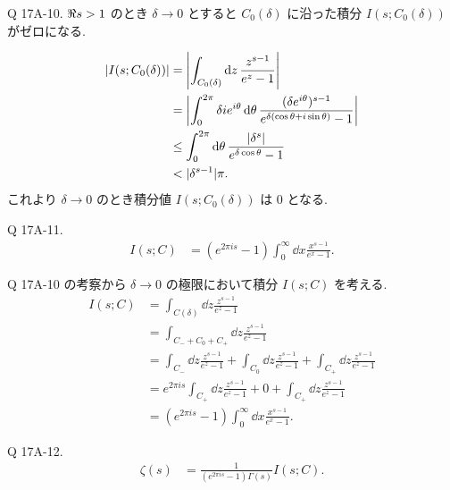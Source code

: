 \documentclass[uplatex,dvipdfmx,a4paper,11pt]{jlreq}
\theoremstyle{definition}
\begin{document}
\begin{itembox}[l]{Q 17A-10.}
  $\real s > 1$ のとき $\delta\to 0$ とすると $C_0(\delta)$ に沿った積分 $I(s;C_0(\delta))$ がゼロになる.
\end{itembox}
\begin{align}
  |I(s;C_0(\delta))| & = \qty|\int_{C_0(\delta)}\dd{z}\frac{z^{s-1}}{e^z - 1}|                                                                        \\
                     & = \qty|\int_0^{2\pi}\delta ie^{i\theta}\dd{\theta}\frac{(\delta e^{i\theta})^{s-1}}{e^{\delta(\cos\theta + i\sin\theta)} - 1}| \\
                     & \leq \int_0^{2\pi}\dd{\theta}\frac{|\delta^s|}{e^{\delta\cos\theta} - 1}                                                       \\
                     & < |\delta^{s-1}|\pi.
\end{align}
これより $\delta\to 0$ のとき積分値 $I(s; C_0(\delta))$ は $0$ となる.

\begin{itembox}[l]{Q 17A-11.}
  \begin{align}
    I(s; C) & = (e^{2\pi is} - 1)\int_0^\infty\dd{x}\frac{x^{s-1}}{e^x - 1}.
  \end{align}
\end{itembox}
Q 17A-10 の考察から $\delta\to 0$ の極限において積分 $I(s; C)$ を考える.
\begin{align}
  I(s; C) & = \int_{C(\delta)}\dd{z}\frac{z^{s-1}}{e^z - 1}                                                                               \\
          & = \int_{C_- + C_0 + C_+}\dd{z}\frac{z^{s-1}}{e^z - 1}                                                                         \\
          & = \int_{C_-}\dd{z}\frac{z^{s-1}}{e^z - 1} + \int_{C_0}\dd{z}\frac{z^{s-1}}{e^z - 1} + \int_{C_+}\dd{z}\frac{z^{s-1}}{e^z - 1} \\
          & = e^{2\pi is}\int_{C_+}\dd{z}\frac{z^{s-1}}{e^z - 1} + 0 + \int_{C_+}\dd{z}\frac{z^{s-1}}{e^z - 1}                            \\
          & = (e^{2\pi is} - 1)\int_{0}^\infty\dd{x}\frac{x^{s-1}}{e^x - 1}.
\end{align}

\begin{itembox}[l]{Q 17A-12.}
  \begin{align}
    \zeta(s) & = \frac{1}{(e^{2\pi is} - 1)\Gamma(s)}I(s; C).
  \end{align}
\end{itembox}
\end{document}
